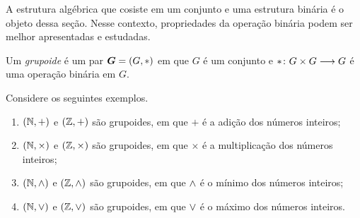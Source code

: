 \begin{comment}
\begin{definition}
Seja $X$ um conjunto. Uma operação binária \emph{associativa} é uma operação binária $\fun{\opb}{X \times X}{X}$ que satisfaz
	\begin{itemize}
	\item (Associatividade) Para todos $x,x',x'' \in X$,
		\begin{equation*}
		(x \opb x') \opb x'' = x \opb (x' \opb x'').
		\end{equation*}
	\end{itemize}
Uma operação binária \emph{comutativa} é uma operação binária $\fun{\opb}{X \times X}{X}$ que satisfaz
	\begin{itemize}
	\item (Comutatividade) Para todos $x,x' \in X$
		\begin{equation*}
		x \opb x' = x' \opb x.
		\end{equation*}
	\end{itemize}
\end{definition}

\begin{definition}
Sejam $X$ um conjunto e $+$ uma operação binária em $X$. Uma operação binária \emph{distributiva} sobre $+$ é uma operação binária $\times$ em $X$ que satisfaz
	\begin{itemize}
	\item (Distributividade) Para todos $x,x',x'' \in X$,
	\begin{equation*}
	x \times (x' + x'') = (x \times x') + (x \times x'').
	\end{equation*}
	\end{itemize}
\end{definition}
\end{comment}

A estrutura algébrica que cosiste em um conjunto e uma estrutura binária é o objeto dessa seção. Nesse contexto, propriedades da operação binária podem ser melhor apresentadas e estudadas.

\begin{definition}
Um \emph{grupoide} é um par $\bm G=(G,\ast)$ em que $G$ é um conjunto e ${\ast}\colon {G \times G} \longrightarrow {G}$ é uma operação binária em $G$.
\end{definition}

\begin{example}
Considere os seguintes exemplos.
	\begin{enumerate}
	\item $(\mathbb{N},+)$ e $(\mathbb{Z},+)$ são grupoides, em que $+$ é a adição dos números inteiros;
	\item $(\mathbb{N},\times)$ e $(\mathbb{Z},\times)$ são grupoides, em que $\times$ é a multiplicação dos números inteiros;
	\item $(\mathbb{N},\mathbin{\wedge})$ e $(\mathbb{Z},\mathbin{\wedge})$ são grupoides, em que $\mathbin{\wedge}$ é o mínimo dos números inteiros;
	\item $(\mathbb{N},\mathbin{\vee})$ e $(\mathbb{Z},\mathbin{\vee})$ são grupoides, em que $\mathbin{\vee}$ é o máximo dos números inteiros.
	\end{enumerate}
\end{example}

